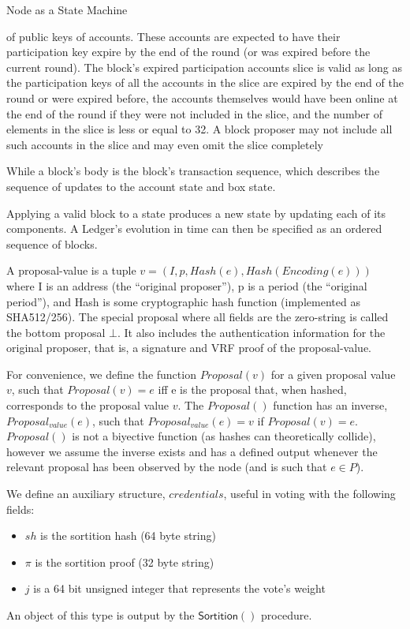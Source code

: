 \documentclass[10pt,a4paper]{article}
\begin{document}
\begin{section}{Node as a State Machine}
\begin{itemize}
    of public keys of accounts. These accounts are expected to have their
    participation key expire by the end of the round (or was expired before
    the current round).
    The block's expired participation accounts slice is valid as long as the participation keys 
    of all the accounts in the slice are expired by the end of the round or
    were expired before, the accounts themselves would have been online at the end
    of the round if they were not included in the slice, and the number of elements
    in the slice is less or equal to 32. A block proposer may not include all such
    accounts in the slice and may even omit the slice completely
\end{itemize}
While a block's body is the block's transaction sequence, which describes the sequence
of updates to the account state and box state.

Applying a valid block to a state produces a new state by updating each of its components.
A Ledger's evolution in time can then be specified as an ordered sequence of blocks.

A proposal-value is a tuple $v = (I, p, Hash(e), Hash(Encoding(e)))$ where I is
an address (the “original proposer”), p is a period (the “original period”), and
Hash is some cryptographic hash function (implemented as SHA512/256). The special proposal where all fields
are the zero-string is called the bottom proposal $\bot$. 
It also includes the authentication information for the original proposer, that is, a signature and VRF proof of the proposal-value.

For convenience, we define the function $Proposal(v)$ for a given proposal value $v$,
such that $Proposal(v) = e$ iff e is the proposal that, when hashed, corresponds to the proposal
value $v$. The $Proposal()$ function has an inverse, $Proposal_{value}(e)$, such that
$Proposal_{value}(e) = v$ if $Proposal(v) = e$.
$Proposal()$ is not a biyective function (as hashes can theoretically collide), however we assume the inverse
exists and has a defined output whenever the relevant proposal has been observed by the node
(and is such that $e \in P$).

We define an auxiliary structure, $credentials$, useful in voting with the following fields:
\begin{itemize}
    \item $sh$ is the sortition hash (64 byte string)
    \item $\pi$ is the sortition proof (32 byte string)
    \item $j$ is a 64 bit unsigned integer that represents the vote's weight
\end{itemize}
An object of this type is output by the $\mathsf{Sortition}()$ procedure.


\end{section}
\end{document}
